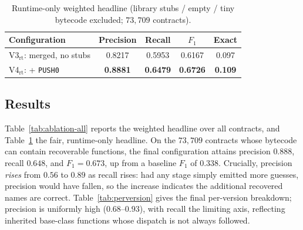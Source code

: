 \documentclass{stylefiles/capstone}
\begin{document}
\begin{table}[t]
\centering
\caption{Runtime-only weighted headline (library stubs / empty / tiny bytecode
excluded; $73{,}709$ contracts).}
\label{tab:ablation-rt}
\small
\begin{tabular}{l c c c c}
\toprule
Configuration & Precision & Recall & $F_1$ & Exact \\
\midrule
V3$_{\text{rt}}$: merged, no stubs & 0.8217 & 0.5953 & 0.6167 & 0.097 \\
V4$_{\text{rt}}$: + \texttt{PUSH0} & \textbf{0.8881} & \textbf{0.6479} & \textbf{0.6726} & \textbf{0.109} \\
\bottomrule
\end{tabular}
\end{table}

\subsection{Results}

Table~\ref{tab:ablation-all} reports the weighted headline over all contracts, and
Table~\ref{tab:ablation-rt} the fair, runtime-only headline. On the $73{,}709$
contracts whose bytecode can contain recoverable functions, the final
configuration attains precision $0.888$, recall $0.648$, and $F_1=0.673$, up from
a baseline $F_1$ of $0.338$. Crucially, precision \emph{rises} from $0.56$ to
$0.89$ as recall rises: had any stage simply emitted more guesses, precision would
have fallen, so the increase indicates the additional recovered names are correct.
Table~\ref{tab:perversion} gives the final per-version breakdown; precision is
uniformly high ($0.68$--$0.93$), with recall the limiting axis, reflecting
inherited base-class functions whose dispatch is not always followed.
\end{document}
